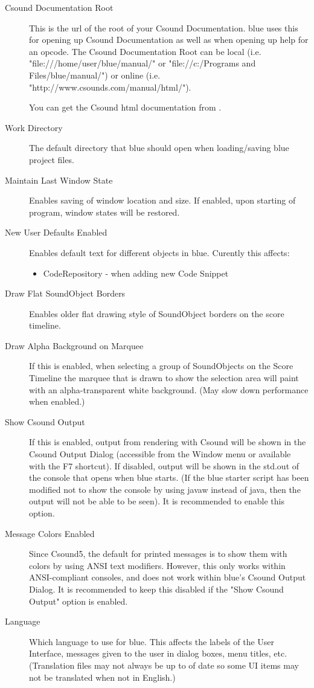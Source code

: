 \begin{description}
\item[Csound Documentation Root]
This is the url of the root of your Csound Documentation. blue uses this
for opening up Csound Documentation as well as when opening up help for
an opcode. The Csound Documentation Root can be local (i.e.
"file:///home/user/blue/manual/" or "file://c:/Programs and
Files/blue/manual/") or online (i.e.
"http://www.csounds.com/manual/html/").

You can get the Csound html documentation from
\href{http://www.csounds.com/manual}{} .
\item[Work Directory]
The default directory that blue should open when loading/saving blue
project files.
\item[Maintain Last Window State]
Enables saving of window location and size. If enabled, upon starting of
program, window states will be restored.
\item[New User Defaults Enabled]
Enables default text for different objects in blue. Curently this
affects:

\begin{itemize}
\item
  CodeRepository - when adding new Code Snippet
\end{itemize}
\item[Draw Flat SoundObject Borders]
Enables older flat drawing style of SoundObject borders on the score
timeline.
\item[Draw Alpha Background on Marquee]
If this is enabled, when selecting a group of SoundObjects on the Score
Timeline the marquee that is drawn to show the selection area will paint
with an alpha-transparent white background. (May slow down performance
when enabled.)
\item[Show Csound Output]
If this is enabled, output from rendering with Csound will be shown in
the Csound Output Dialog (accessible from the Window menu or available
with the F7 shortcut). If disabled, output will be shown in the std.out
of the console that opens when blue starts. (If the blue starter script
has been modified not to show the console by using javaw instead of
java, then the output will not be able to be seen). It is recommended to
enable this option.
\item[Message Colors Enabled]
Since Csound5, the default for printed messages is to show them with
colors by using ANSI text modifiers. However, this only works within
ANSI-compliant consoles, and does not work within blue's Csound Output
Dialog. It is recommended to keep this disabled if the "Show Csound
Output" option is enabled.
\item[Language]
Which language to use for blue. This affects the labels of the User
Interface, messages given to the user in dialog boxes, menu titles, etc.
(Translation files may not always be up to of date so some UI items may
not be translated when not in English.)
\end{description}

